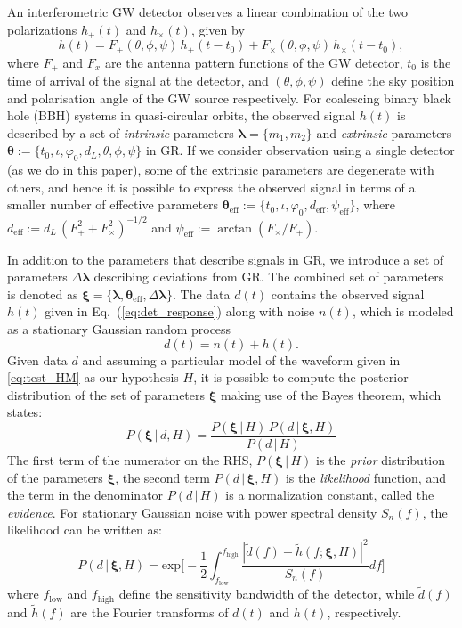 \documentclass[prl,preprintnumbers,twocolumn,eqsecnum,floatfix,a4paper,nofootinbib,superscriptaddress]{revtex4}
\newcommand{\blambda}{\bm{\lambda}}
\newcommand{\btheta}{\bm{\theta}}
\newcommand{\bxi}{\bm{\xi}}
\begin{document}
An interferometric GW detector observes a linear combination of the two polarizations $h_+(t)$ and $h_\times(t)$, given by 
\begin{equation}
h(t) = F_+(\theta, \phi, \psi) \, h_+(t-t_0) + F_{\times}(\theta, \phi, \psi)\, {h}_{\times}(t-t_0), 
\label{eq:det_response}
\end{equation}
where $F_+$ and $F_x$ are the antenna pattern functions of the GW detector, $t_0$ is the time of arrival of the signal at the detector, and $(\theta, \phi, \psi)$ define the sky position and polarisation angle of the GW source respectively. For coalescing binary black hole (BBH) systems in quasi-circular orbits, the observed signal $h(t)$ is described by a set of \emph{intrinsic} parameters $\blambda = \{m_1, m_2\}$ and \emph{extrinsic} parameters  $\btheta := \{t_0, \iota, \varphi_0, d_L, \theta, \phi, \psi\}$ in GR. If we consider observation using a single detector (as we do in this paper), some of the extrinsic parameters are degenerate with others, and hence it is possible to express the observed signal in terms of a smaller number of effective parameters $\btheta_\mathrm{eff} := \{t_0, \iota, \varphi_0, d_\mathrm{eff}, \psi_\mathrm{eff}\}$, where $d_\mathrm{eff} := d_L \, (F_+^2 + F_\times^2)^{-1/2}$ and $\psi_\mathrm{eff}:= \arctan (F_\times/F_+)$. 

In addition to the parameters that describe signals in GR, we introduce a set of parameters $\Delta \blambda$ describing deviations from GR. The combined set of parameters is denoted as $\bxi = \{\blambda, \btheta_\mathrm{eff}, \Delta \blambda\}$. The data $d(t)$ contains the observed signal $h(t)$ given in Eq.~(\ref{eq:det_response}) along with noise $n(t)$, which is modeled as a stationary Gaussian random process 
\begin{equation}
d(t) = n(t) + h(t). 
\label{eq:detector_strain}
\end{equation}
Given data $d$ and assuming a particular model of the waveform given in \eqref{eq:test_HM} as our hypothesis $H$, it is possible to compute the posterior distribution of the set of parameters ${\bxi}$ making use of the Bayes theorem, which states: 
\begin{equation}
P({\bxi} \, | \, d, H) = \frac{P({\bxi} \, | \, H) \, P (d \, | \, {\bxi}, H)}{P(d \, | \, H)}
\label{eq:Bayes_theorem}
\end{equation} 
The first term of the numerator on the RHS, $P({\bxi} \, | \, H)$ is the \emph{prior} distribution of the parameters ${\bxi}$, the second term $P (d \, | \, {\bxi}, H)$ is the \emph{likelihood} function, and the term in the denominator $P(d \, | \, H)$ is a normalization constant, called the \emph{evidence}. For stationary Gaussian noise with power spectral density $S_n(f)$, the likelihood can be written as:
\begin{equation}
P (d \, | \, {\bxi}, H) = \text{exp}\Big[ -\frac{1}{2}\int_{f_\mathrm{low}}^{f_\mathrm{high}} \frac{|\tilde{d}(f) - \tilde{h}(f;{\bxi}, H)|^2}{S_n(f)}df\Big]
\end{equation}
where $f_\mathrm{low}$ and $f_\mathrm{high}$ define the sensitivity bandwidth of the detector, while $\tilde{d}(f)$ and $\tilde{h}(f)$ are the Fourier transforms of $d(t)$ and $h(t)$, respectively. 
\end{document}
